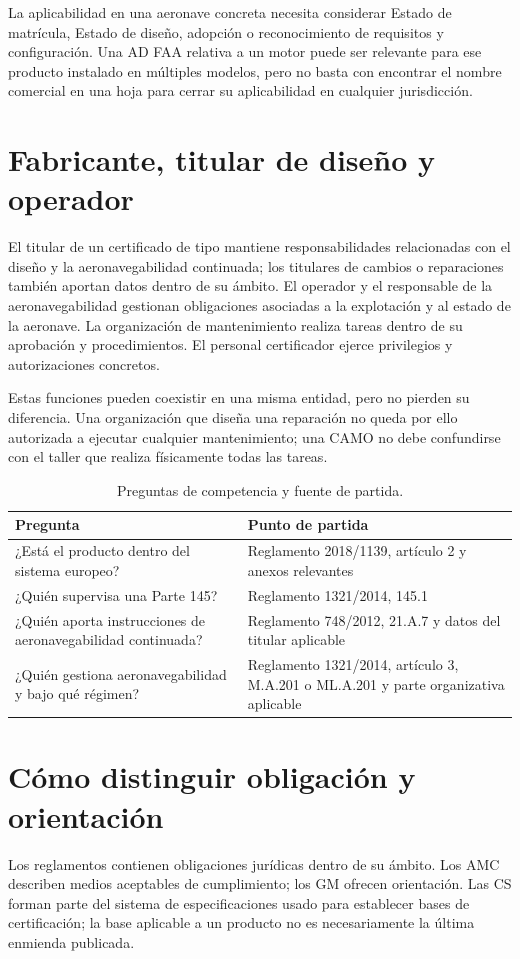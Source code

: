La aplicabilidad en una aeronave concreta necesita considerar Estado de matrícula, Estado de diseño, adopción o reconocimiento de requisitos y configuración. Una AD FAA relativa a un motor puede ser relevante para ese producto instalado en múltiples modelos, pero no basta con encontrar el nombre comercial en una hoja para cerrar su aplicabilidad en cualquier jurisdicción.
\section{Fabricante, titular de diseño y operador}
El titular de un certificado de tipo mantiene responsabilidades relacionadas con el diseño y la aeronavegabilidad continuada; los titulares de cambios o reparaciones también aportan datos dentro de su ámbito. El operador y el responsable de la aeronavegabilidad gestionan obligaciones asociadas a la explotación y al estado de la aeronave. La organización de mantenimiento realiza tareas dentro de su aprobación y procedimientos. El personal certificador ejerce privilegios y autorizaciones concretos.

Estas funciones pueden coexistir en una misma entidad, pero no pierden su diferencia. Una organización que diseña una reparación no queda por ello autorizada a ejecutar cualquier mantenimiento; una CAMO no debe confundirse con el taller que realiza físicamente todas las tareas.
\begin{table}[htbp]\centering\small\caption{Preguntas de competencia y fuente de partida.}\label{tab:autoridades}
\begin{tabular}{p{.43\linewidth}p{.45\linewidth}}\toprule
Pregunta & Punto de partida\\\midrule
¿Está el producto dentro del sistema europeo? & Reglamento 2018/1139, artículo 2 y anexos relevantes\\[4pt]
¿Quién supervisa una Parte 145? & Reglamento 1321/2014, 145.1\\[4pt]
¿Quién aporta instrucciones de aeronavegabilidad continuada? & Reglamento 748/2012, 21.A.7 y datos del titular aplicable\\[4pt]
¿Quién gestiona aeronavegabilidad y bajo qué régimen? & Reglamento 1321/2014, artículo 3, M.A.201 o ML.A.201 y parte organizativa aplicable\\\bottomrule
\end{tabular}\end{table}
\section{Cómo distinguir obligación y orientación}
Los reglamentos contienen obligaciones jurídicas dentro de su ámbito. Los AMC describen medios aceptables de cumplimiento; los GM ofrecen orientación. Las CS forman parte del sistema de especificaciones usado para establecer bases de certificación; la base aplicable a un producto no es necesariamente la última enmienda publicada.

